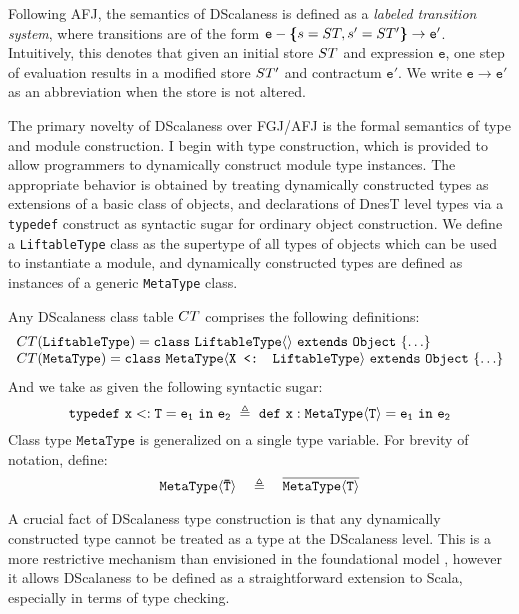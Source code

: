 Following AFJ, the semantics of DScalaness is defined as a \emph{labeled transition system},
where transitions are of the form $\texttt{e} - \textup{\textbf{\{}} s = ST, s' = ST' \textup{\textbf{\}}} \rightarrow
\texttt{e}' $. Intuitively, this denotes that given an initial store $ST$ and expression
$\texttt{e}$, one step of evaluation results in a modified store $ST'$ and contractum
$\texttt{e}'$. We write $\texttt{e} \rightarrow \texttt{e}'$ as an abbreviation when the store
is not altered.

The primary novelty of DScalaness over FGJ/AFJ is the formal semantics of type and module
construction. I begin with type construction, which is provided to allow programmers to
dynamically construct module type instances. The appropriate behavior is obtained by treating
dynamically constructed types as extensions of a basic class of objects, and declarations of
DnesT level types via a \texttt{typedef} construct as syntactic sugar for ordinary object
construction. We define a \texttt{LiftableType} class as the supertype of all types of objects
which can be used to instantiate a module, and dynamically constructed types are defined as
instances of a generic \texttt{MetaType} class.
\begin{definition}
Any DScalaness class table ${CT}$ comprises the following definitions:
$$
\begin{array}{l}
{CT}(\texttt{LiftableType}) = \mathtt{class\ \texttt{LiftableType}\langle \rangle\ extends\ Object\ \{\ldots \}}\\
{CT}(\texttt{MetaType}) = \mathtt{class\ \texttt{MetaType}\langle \texttt{X <: LiftableType}\rangle\ extends\ Object\ \{ \ldots  \}}
\end{array}
$$
And we take as given the following syntactic sugar:
$$
\jtlet{x}{T}{e_1}{e_2}\ \defeq\ \jdef{x}{\jinst{MetaType}{T}}{e_1}{e_2}
$$
Class type $\texttt{MetaType}$ is generalized on a single type variable. For brevity of
notation, define:
$$
\mathtt{\texttt{MetaType}\langle {\ensuremath{\mathtt{\bar{T}}}} \rangle}\quad \triangleq \quad \overline{\mathtt{MetaType\langle T \rangle}}
$$
\end{definition}
A crucial fact of DScalaness type construction is that any dynamically constructed type cannot be
treated as a type at the DScalaness level. This is a more restrictive mechanism than envisioned
in the foundational model \cite{FramedML,FramedMLworkshop}, however it allows DScalaness to be
defined as a straightforward extension to Scala, especially in terms of type checking.

